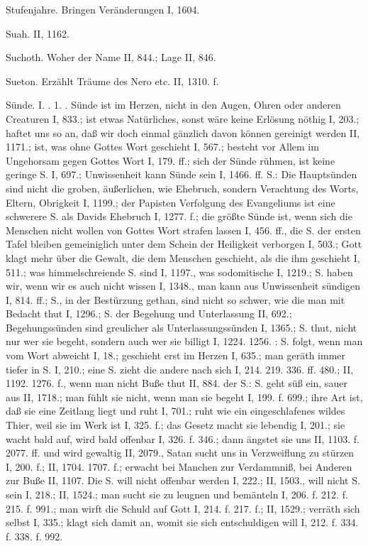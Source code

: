 Stufenjahre. Bringen Veränderungen I, 1604.

Suah. II, 1162.

Suchoth. Woher der Name II, 844.; Lage II, 846.

Sueton. Erzählt Träume des Nero etc. II, 1310. f.

Sünde. I. . 1. . Sünde ist im Herzen, nicht in den Augen, Ohren oder anderen Creaturen I, 833.; ist etwas Natürliches, sonst wäre keine Erlösung nöthig I, 203.; haftet uns so an, daß wir doch einmal gänzlich davon können gereinigt werden II, 1171.; ist, was ohne Gottes Wort geschieht I, 567.; besteht vor Allem im Ungehorsam gegen Gottes Wort I, 179. ff.; sich der Sünde rühmen, ist keine geringe S. I, 697.; Unwissenheit kann Sünde sein I, 1466. ff.  S.: Die Hauptsünden sind nicht die groben, äußerlichen, wie Ehebruch, sondern Verachtung des Worts, Eltern, Obrigkeit I, 1199.; der Papisten Verfolgung des Evangeliums ist eine schwerere S. als Davids Ehebruch I, 1277. f.; die größte Sünde ist, wenn sich die Menschen nicht wollen von Gottes Wort strafen lassen I, 456. ff., die S. der ersten Tafel bleiben gemeiniglich unter dem Schein der Heiligkeit verborgen I, 503.; Gott klagt mehr über die Gewalt, die dem Menschen geschieht, als die ihm geschieht I, 511.; was himmelschreiende S. sind I, 1197., was sodomitische I, 1219.; S. haben wir, wenn wir es auch nicht wissen I, 1348., man kann aus Unwissenheit sündigen I, 814. ff.; S., in der Bestürzung gethan, sind nicht so schwer, wie die man mit Bedacht thut I, 1296.; S. der Begehung und Unterlassung II, 692.; Begehungssünden sind greulicher als Unterlassungssünden I, 1365.; S. thut, nicht nur wer sie begeht, sondern auch wer sie billigt I, 1224. 1256. : S. folgt, wenn man vom Wort abweicht I, 18.; geschieht erst im Herzen I, 635.; man geräth immer tiefer in S. I, 210.; eine S. zieht die andere nach sich I, 214. 219. 336. ff. 480.; II, 1192. 1276. f., wenn man nicht Buße thut II, 884.  der S.: S. geht süß ein, sauer aus II, 1718.; man fühlt sie nicht, wenn man sie begeht I, 199. f. 699.; ihre Art ist, daß sie eine Zeitlang liegt und ruht I, 701.; ruht wie ein eingeschlafenes wildes Thier, weil sie im Werk ist I, 325. f.; das Gesetz macht sie lebendig I, 201.; sie wacht bald auf, wird bald offenbar I, 326. f. 346.; dann ängstet sie uns II, 1103. f. 2077. ff. und wird gewaltig II, 2079., Satan sucht uns in Verzweiflung zu stürzen I, 200. f.; II, 1704. 1707. f.; erwacht bei Manchen zur Verdammniß, bei Anderen zur Buße II, 1107. Die S. will nicht offenbar werden I, 222.; II, 1503., will nicht S. sein I, 218.; II, 1524.; man sucht sie zu leugnen und bemänteln I, 206. f. 212. f. 215. f. 991.; man wirft die Schuld auf Gott I, 214. f. 217. f.; II, 1529.; verräth sich selbst I, 335.; klagt sich damit an, womit sie sich entschuldigen will I, 212. f. 334. f. 338. f. 992.

